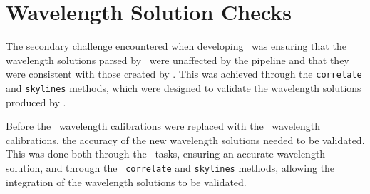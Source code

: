 
\section{Wavelength Solution Checks} \label{sec:test_wav}

The secondary challenge encountered when developing \stops\ was ensuring that the wavelength solutions parsed by \stops\ were unaffected by the pipeline and that they were consistent with those created by \polsalt. This was achieved through the \texttt{correlate} and \texttt{skylines} methods, which were designed to validate the wavelength solutions produced by \iraf.

Before the \polsalt\ wavelength calibrations were replaced with the \iraf\ wavelength calibrations, the accuracy of the new wavelength solutions needed to be validated. This was done both through the \iraf\ tasks, ensuring an accurate wavelength solution, and through the \stops\ \texttt{correlate} and \texttt{skylines} methods, allowing the integration of the wavelength solutions to be validated.




